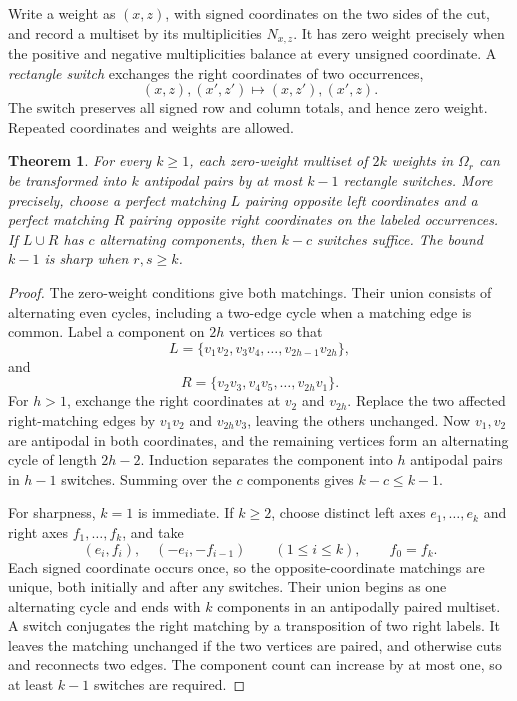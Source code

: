 \documentclass[11pt]{amsart}
\numberwithin{equation}{section}
\newtheorem{theorem}{Theorem}[section]
\theoremstyle{definition}
\begin{document}
Write a weight as $(x,z)$, with signed coordinates on the two sides of the cut, and record a multiset by its multiplicities $N_{x,z}$. It has zero weight precisely when the positive and negative multiplicities balance at every unsigned coordinate. A \emph{rectangle switch} exchanges the right coordinates of two occurrences,
\begin{equation}\label{eq:rectangle}
 (x,z),(x',z')\longmapsto(x,z'),(x',z).
\end{equation}
The switch preserves all signed row and column totals, and hence zero weight. Repeated coordinates and weights are allowed.

\begin{theorem}\label{thm:switches}
For every $k\geq1$, each zero-weight multiset of $2k$ weights in $\Omega_r$ can be transformed into $k$ antipodal pairs by at most $k-1$ rectangle switches. More precisely, choose a perfect matching $L$ pairing opposite left coordinates and a perfect matching $R$ pairing opposite right coordinates on the labeled occurrences. If $L\cup R$ has $c$ alternating components, then $k-c$ switches suffice. The bound $k-1$ is sharp when $r,s\geq k$.
\end{theorem}
\begin{proof}
The zero-weight conditions give both matchings. Their union consists of alternating even cycles, including a two-edge cycle when a matching edge is common. Label a component on $2h$ vertices so that
\[
 L=\{v_1v_2,v_3v_4,\ldots,v_{2h-1}v_{2h}\},
\]
and
\[
 R=\{v_2v_3,v_4v_5,\ldots,v_{2h}v_1\}.
\]
For $h>1$, exchange the right coordinates at $v_2$ and $v_{2h}$. Replace the two affected right-matching edges by $v_1v_2$ and $v_{2h}v_3$, leaving the others unchanged. Now $v_1,v_2$ are antipodal in both coordinates, and the remaining vertices form an alternating cycle of length $2h-2$. Induction separates the component into $h$ antipodal pairs in $h-1$ switches. Summing over the $c$ components gives $k-c\leq k-1$.

For sharpness, $k=1$ is immediate. If $k\geq2$, choose distinct left axes $e_1,\ldots,e_k$ and right axes $f_1,\ldots,f_k$, and take
\[
 (e_i,f_i),\quad(-e_i,-f_{i-1})
 \qquad(1\leq i\leq k),\qquad f_0=f_k.
\]
Each signed coordinate occurs once, so the opposite-coordinate matchings are unique, both initially and after any switches. Their union begins as one alternating cycle and ends with $k$ components in an antipodally paired multiset. A switch conjugates the right matching by a transposition of two right labels. It leaves the matching unchanged if the two vertices are paired, and otherwise cuts and reconnects two edges. The component count can increase by at most one, so at least $k-1$ switches are required.
\end{proof}
\end{document}

